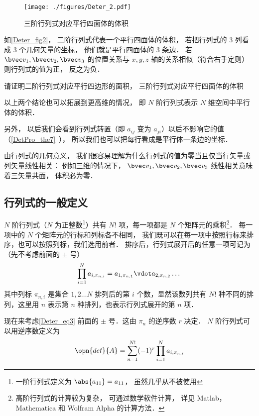 \begin{figure}[ht]
\centering
\texttt{[image: ./figures/Deter\_2.pdf]}
\caption{三阶行列式对应平行四面体的体积} \label{Deter_fig2}
\end{figure}
如\autoref{Deter_fig2}， 二阶行列式代表一个平行四面体的体积， 若把行列式的 3 列看成 3 个几何矢量的坐标， 他们就是平行四面体的 3 条边． 若 $\bvec v_1, \bvec v_2, \bvec v_3$ 的位置关系与 $x, y, z$ 轴的关系相似（符合右手定则） 则行列式的值为正， 反之为负．

\begin{exercise}{}
请证明二阶行列式对应平行四边形的面积， 三阶行列式对应平行四面体的体积
\end{exercise}

以上两个结论也可以拓展到更高维的情况， 即 $N$ 阶行列式表示 $N$ 维空间中平行体的体积．

另外， 以后我们会看到行列式转置（即 $a_{ij}$ 变为 $a_{ji}$）以后不影响它的值（\autoref{DetPro_the7}~）， 所以我们也可以把每行看成是平行体一条边的坐标．

由行列式的几何意义， 我们很容易理解为什么行列式的值为零当且仅当行矢量或列矢量线性相关： 例如三维的情况下， $\bvec v_1, \bvec v_2, \bvec v_3$ 线性相关意味着三矢量共面， 体积必为零．

\subsection{行列式的一般定义}


$N$ 阶行列式（$N$ 为正整数\footnote{一阶行列式定义为 $\abs{a_{11}}=a_{11}$， 虽然几乎从不被使用}）共有 $N!$ 项，每一项都是 $N$ 个矩阵元的乘积\footnote{高阶行列式的计算较为复杂， 可通过数学软件计算， 详见 Matlab，Mathematica 和 Wolfram Alpha 的计算方法．%
}． 每一项中的 $N$ 个矩阵元的行标和列标各不相同， 我们既可以在每一项中按照行标来排序，也可以按照列标，我们选用前者． 排序后，行列式展开后的任意一项可记为（先不考虑前面的 $\pm$ 号）
\begin{equation}\label{Deter_eq3}
\prod_{i=1}^N a_{i,\pi_{n,i}} = 
a_{1,\pi_{n,1}} \vdot a_{2,\pi_{n,2}} \dots
\end{equation}
其中列标 $\pi_{n,i}$ 是集合 ${1,2 \dots N}$ 排列后的第 $i$ 个数，显然该数列共有 $N!$ 种不同的排列，这里用 $n$ 表示第 $n$ 种排列，也表示行列式展开的第 $n$ 项．

现在来考虑\autoref{Deter_eq3} 前面的 $\pm$ 号．这由 $\pi_n$ 的逆序数 $r$ 决定． $N$ 阶行列式可以用逆序数定义为
\begin{equation}\label{Deter_eq4}
\opn{det}{A} = \sum_{n=1}^{N!} (-1)^{r} \prod_{i=1}^N a_{i,\pi_{n,i}}
\end{equation}

